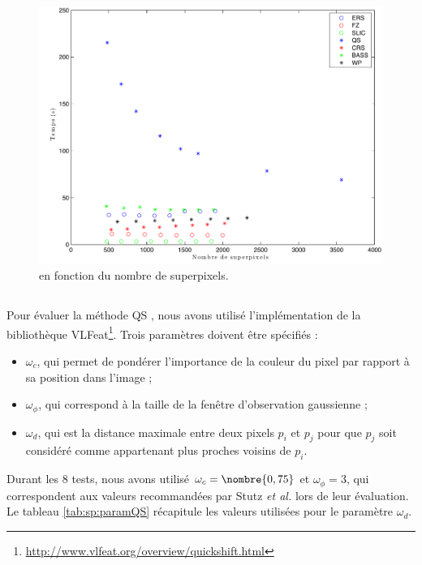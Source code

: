\begin{figure}[htb]
	\centering	
			\includegraphics[width=\textwidth]{images/sur-segmentation/time_NbSp}
		 	\caption{ en fonction du nombre de superpixels.}
		 	\label{fig:sp:time_nbSp}
\end{figure}

\subsection{}

Pour évaluer la méthode QS  \cite{vedaldi2008quick}, nous avons utilisé l'implémentation de la bibliothèque VLFeat\footnote{\url{http://www.vlfeat.org/overview/quickshift.html}}. Trois paramètres doivent être spécifiés :
\begin{itemize}
\item $\omega_{c}$, qui permet de pondérer l'importance de la couleur du pixel par rapport à sa position dans l'image ;
\item $\omega_{\phi}$, qui correspond à la taille de la fenêtre d'observation gaussienne ;
\item $\omega_{d}$, qui est la distance maximale entre deux pixels $p_{i}$ et $p_{j}$ pour que $p_{j}$ soit considéré comme appartenant  plus proches voisins de $p_{i}$.
\end{itemize}

Durant les 8 tests, nous avons utilisé $\omega_{c}=\nombre{0,75}$ et $\omega_{\phi}=3$, qui correspondent aux valeurs recommandées par Stutz \textit{et al.} \cite{stutz2015superpixel} lors de leur évaluation. Le tableau \ref{tab:sp:paramQS} récapitule les valeurs utilisées pour le paramètre $\omega_{d}$.


